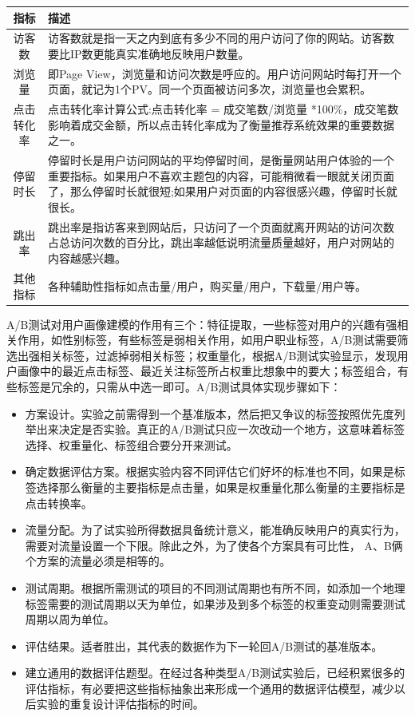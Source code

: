   \begin{table}[htp]
  \centering
  \label{tab:abtest}
  \begin{tabular}{ |c|p{10cm}| } \hline
   指标 & 描述 \\ \hline
   访客数 & 访客数就是指一天之内到底有多少不同的用户访问了你的网站。访客数要比IP数更能真实准确地反映用户数量。\\ \hline
   浏览量 & 即Page View，浏览量和访问次数是呼应的。用户访问网站时每打开一个页面，就记为1个PV。同一个页面被访问多次，浏览量也会累积。 \\ \hline
   点击转化率 & 点击转化率计算公式:点击转化率 = 成交笔数/浏览量 *100\%，成交笔数影响着成交金额，所以点击转化率成为了衡量推荐系统效果的重要数据之一。\\ \hline
   停留时长 & 停留时长是用户访问网站的平均停留时间，是衡量网站用户体验的一个重要指标。如果用户不喜欢主题包的内容，可能稍微看一眼就关闭页面了，那么停留时长就很短;如果用户对页面的内容很感兴趣，停留时长就很长。\\ \hline
   跳出率 & 跳出率是指访客来到网站后，只访问了一个页面就离开网站的访问次数占总访问次数的百分比，跳出率越低说明流量质量越好，用户对网站的内容越感兴趣。 \\ \hline
   其他指标 & 各种辅助性指标如点击量/用户，购买量/用户，下载量/用户等。\\ \hline
  \end{tabular}
  \end{table}

  A/B测试对用户画像建模的作用有三个：特征提取，一些标签对用户的兴趣有强相关作用，如性别标签，有些标签是弱相关作用，如用户职业标签，A/B测试需要筛选出强相关标签，过滤掉弱相关标签；权重量化，根据A/B测试实验显示，发现用户画像中的最近点击标签、最近关注标签所占权重比想象中的要大；标签组合，有些标签是冗余的，只需从中选一即可。A/B测试具体实现步骤如下：

  \begin{itemize}
  \item 方案设计。实验之前需得到一个基准版本，然后把又争议的标签按照优先度列举出来决定是否实验。真正的A/B测试只应一次改动一个地方，这意味着标签选择、权重量化、标签组合要分开来测试。
  \item 确定数据评估方案。根据实验内容不同评估它们好坏的标准也不同，如果是标签选择那么衡量的主要指标是点击量，如果是权重量化那么衡量的主要指标是点击转换率。
  \item 流量分配。为了试实验所得数据具备统计意义，能准确反映用户的真实行为，需要对流量设置一个下限。除此之外，为了使各个方案具有可比性， A、B俩个方案的流量必须是相等的。
  \item 测试周期。根据所需测试的项目的不同测试周期也有所不同，如添加一个地理标签需要的测试周期以天为单位，如果涉及到多个标签的权重变动则需要测试周期以周为单位。
  \item 评估结果。适者胜出，其代表的数据作为下一轮回A/B测试的基准版本。
  \item 建立通用的数据评估题型。在经过各种类型A/B测试实验后，已经积累很多的评估指标，有必要把这些指标抽象出来形成一个通用的数据评估模型，减少以后实验的重复设计评估指标的时间。
  \end{itemize}

